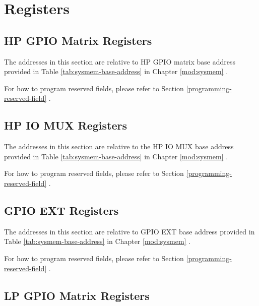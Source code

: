 \documentclass[main\_\_EN.tex]{subfiles}
\begin{document}
\section{Registers}

\subsection{HP GPIO Matrix Registers}
The addresses in this section are relative to HP GPIO matrix base address provided in Table \ref{tab:sysmem-base-address} in Chapter \ref{mod:sysmem} \textit{}.

For how to program reserved fields, please refer to Section \ref{programming-reserved-field} \textit{}.



\subsection{HP IO MUX Registers}

The addresses in this section are relative to the HP IO MUX base address provided in Table \ref{tab:sysmem-base-address} in Chapter \ref{mod:sysmem} \textit{}.

For how to program reserved fields, please refer to Section \ref{programming-reserved-field} \textit{}.



\subsection{GPIO EXT Registers}

The addresses in this section are relative to GPIO EXT base address provided in Table \ref{tab:sysmem-base-address} in Chapter \ref{mod:sysmem} \textit{}.

For how to program reserved fields, please refer to Section \ref{programming-reserved-field} \textit{}.



\subsection{LP GPIO Matrix Registers}
\end{document}
